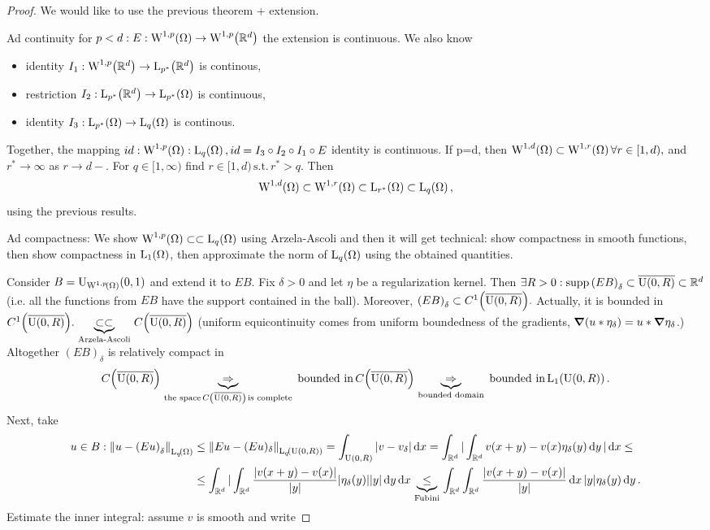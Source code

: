 \documentclass{article}
\begin{document}
\begin{proof}
	We would like to use the previous theorem + extension. 

	Ad continuity for $p<d: E:\WkpSet[1][p]{\Omega} \to \WkpSet[1][p]{\R^d}$ the extension is continuous. We also know
	\begin{itemize}
		\item identity $I_1:\WkpSet[1][p]{\R^d}\to \LpSet[p^{*}]{\R^d}$ is continous, 
		\item restriction $I_2: \LpSet[p^{*}]{\R^d}\to \LpSet[p^{*}]{\Omega}$ is continuous, 
		\item identity $I_3: \LpSet[p^{*}]{\Omega} \to \LpSet[q]{\Omega}$ is continous.
	\end{itemize}
	Together, the mapping $id:\WkpSet[1][p]{\Omega}: \LpSet[q]{\Omega}, id=I_3 \circ I_2 \circ I_1 \circ E$ identity is continuous. If p=d, then $\WkpSet[1][d]{\Omega} \subset \WkpSet[1][r]{\Omega} \forall r \in [1,d),$ and $r^{*} \to \infty$ as $r\to d-.$ For $q \in [1,\infty)$ find $r \in [1,d) \, \text{s.t.} \, r^{*} >q.$ Then
	\[
		\WkpSet[1][d]{\Omega} \subset \WkpSet[1][r]{\Omega} \subset \LpSet[r^{*}]{\Omega} \subset \LpSet[q]{\Omega},
	\]
	using the previous results.

	Ad compactness: We show $\WkpSet[1][p]{\Omega} \subset \subset \LpSet[q]{\Omega}$ using Arzela-Ascoli and then it will get technical: show compactness in smooth functions, then show compactness in $\LpSet[1]{\Omega}$, then approximate the norm of $\LpSet[q]{\Omega}$ using the obtained quantities.

	Consider $B=\text{U}_{\WkpSet[1][p]{\Omega}}(0,1)$ and extend it to $EB$. Fix $\delta>0$ and let $\eta$ be a regularization kernel. Then $\exists R>0: \operatorname{supp} \qty(EB)_{\delta} \subset \overline{\text{U}(0,R)} \subset {\mathbb R}^d$ (i.e. all the functions from $EB$ have the support contained in the ball). Moreover, $\qty(EB)_{\delta} \subset C^1\qty(\overline{\text{U}(0,R)}).$ Actually, it is bounded in $C^1\qty(\overline{\text{U}(0,R)}). \underbrace{\subset \subset}_{\, \text{Arzela-Ascoli} \,} C\qty(\overline{\text{U}(0,R)})$ (uniform equicontinuity comes from uniform boundedness of the gradients, $\grad\qty(u * \eta_{\delta}) = u * \grad \eta_{\delta}$.)
	Altogether $(EB)_{\delta}$ is relatively compact in
	\[
		C\qty(\overline{\text{U}(0,R)}) \underbrace{\Rightarrow}_{\, \text{the space} \, C\qty(\overline{\text{U}(0,R)}) \, \text{is complete} \,}\, \text{bounded in} \,C\qty(\overline{\text{U}(0,R)}) \underbrace{\Rightarrow}_{\, \text{bounded domain} \,} \, \text{bounded in} \, \LpSet[1]{\text{U}(0,R)}.
	\]
	Next, take
	\begin{align*}
		u \in B: \norm{u-\qty(Eu)_{\delta}}_{\LpSet[q]{\Omega}} &\leq \norm{Eu-(Eu)_{\delta}}_{\LpSet[q]{\text{U}(0,R)}} = \int_{\text{U}(0,R)}|v-v_{\delta}|\dd{x} = \int_{\R^d}|\int_{\R^d}v\qty(x+y)-v(x) \eta_{\delta}(y)\dd{y}|\dd{x}\leq \\
									&\leq \int_{\R^d}|\int_{\R^d}\frac{|v(x+y)-v(x)|}{|y|}|\eta_{\delta}(y)| |y| \dd{y}\dd{x} \underbrace{\leq}_{\, \text{Fubini} \,} \int_{\R^d}\int_{\R^d}\frac{|v(x+y)-v(x)|}{|y|}\dd{x}|y| \eta_{\delta}(y)\dd{y}.
	\end{align*}
	Estimate the inner integral: assume $v$ is smooth and write


\end{proof}
\end{document}
